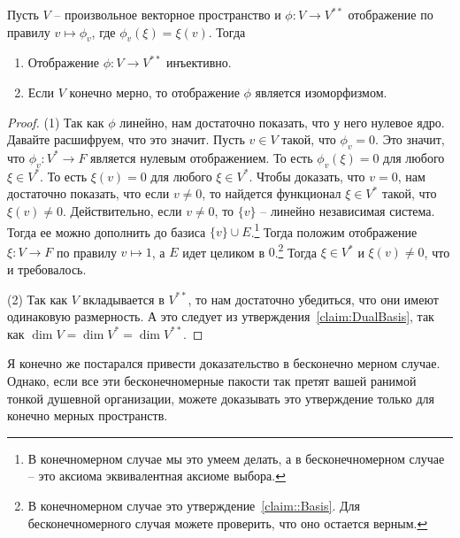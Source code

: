 \begin{claim}\label{claim::DoubleDuoIsom}
Пусть $V$ -- произвольное векторное пространство и $\phi\colon V\to V^{**}$ отображение по правилу $v\mapsto \phi_v$, где $\phi_v(\xi) = \xi(v)$. Тогда 
\begin{enumerate}
\item Отображение $\phi\colon V\to V^{**}$ инъективно.
\item Если $V$ конечно мерно, то отображение $\phi$ является изоморфизмом.
\end{enumerate}
\end{claim}
\begin{proof}
(1) Так как $\phi$ линейно, нам достаточно показать, что у него нулевое ядро. Давайте расшифруем, что это значит. Пусть $v\in V$ такой, что $\phi_v = 0$. Это значит, что $\phi_v \colon V^* \to F$ является нулевым отображением. То есть $\phi_v(\xi) = 0$ для любого $\xi \in V^*$. То есть $\xi(v) = 0$ для любого $\xi \in V^*$. Чтобы доказать, что $v = 0$, нам достаточно показать, что если $v\neq0$, то найдется функционал $\xi \in V^*$ такой, что $\xi(v)\neq 0$. Действительно, если $v\neq 0$, то $\{v\}$ -- линейно независимая система. Тогда ее можно дополнить до базиса $\{v\}\cup E$.\footnote{В конечномерном случае мы это умеем делать, а в бесконечномерном случае -- это аксиома эквивалентная аксиоме выбора.} Тогда положим отображение $\xi \colon V\to F$ по правилу $v\mapsto 1$, а $E$ идет целиком в $0$.\footnote{В конечномерном случае это утверждение~\ref{claim::Basis}. Для бесконечномерного случая можете проверить, что оно остается верным.} Тогда $\xi\in V^*$ и $\xi(v)\neq 0$, что и требовалось.

(2) Так как $V$ вкладывается в $V^{**}$, то нам достаточно убедиться, что они имеют одинаковую размерность. А это следует из утверждения~\ref{claim:DualBasis}, так как $\dim V = \dim V^* = \dim V^{**}$.
\end{proof}

Я конечно же постарался привести доказательство в бесконечно мерном случае. Однако, если все эти бесконечномерные пакости так претят вашей ранимой тонкой душевной организации, можете доказывать это утверждение только для конечно мерных пространств.

